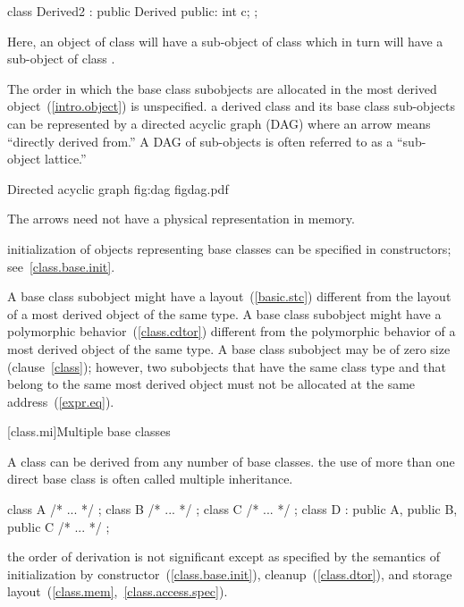 \begin{codeblock}
class Derived2 : public Derived {
public:
    int c;
};
\end{codeblock}

Here, an object of class  will have a sub-object of class
 which in turn will have a sub-object of class
.
\exitexample

\pnum
The order in which the base class subobjects are allocated in the most
derived object~(\ref{intro.object}) is unspecified.
\enternote
{}%
%
a derived class and its base class sub-objects can be represented by a
directed acyclic graph (DAG) where an arrow means ``directly derived
from.'' A DAG of sub-objects is often referred to as a ``sub-object
lattice.''

\begin{importgraphic}
{Directed acyclic graph}
{fig:dag}
{figdag.pdf}
\end{importgraphic}

The arrows need not have a physical representation in memory.
\exitnote

\pnum
\enternote
initialization of objects representing base classes can be specified in
constructors; see~\ref{class.base.init}.
\exitnote

\pnum
\enternote
A base class subobject might have a layout~(\ref{basic.stc}) different
from the layout of a most derived object of the same type. A base class
subobject might have a polymorphic behavior~(\ref{class.cdtor})
different from the polymorphic behavior of a most derived object of the
same type. A base class subobject may be of zero size (clause~\ref{class});
however, two subobjects that have the same class type and that belong to
the same most derived object must not be allocated at the same
address~(\ref{expr.eq}).
\exitnote

[class.mi]{Multiple base classes}
%
%

\pnum
A class can be derived from any number of base classes.
\enternote
the use of more than one direct base class is often called multiple inheritance.
\exitnote
\enterexample
\begin{codeblock}
class A { /* ... */ };
class B { /* ... */ };
class C { /* ... */ };
class D : public A, public B, public C { /* ... */ };
\end{codeblock}
\exitexampleb

\pnum
{}%
%
\enternote
the order of derivation is not significant except as specified by the
semantics of initialization by constructor~(\ref{class.base.init}),
cleanup~(\ref{class.dtor}), and storage
layout~(\ref{class.mem},~\ref{class.access.spec}).
\exitnote

